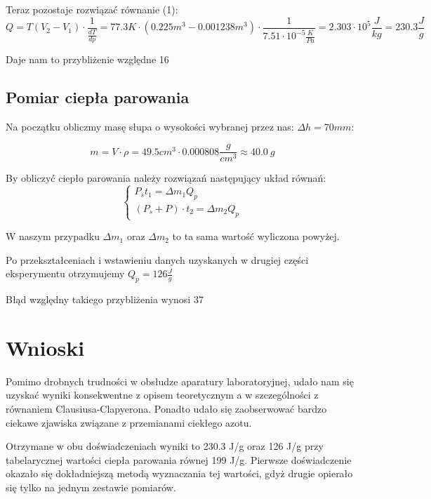 \documentclass{article}
\begin{document}
Teraz pozostaje rozwiązać równanie (1):
\begin{equation}
	Q = T(V_2-V_1) \cdot \frac{1}{\frac{dT}{dp}} = 77.3K \cdot (0.225 m^3 - 0.001238 m^3) \cdot \frac{1}{7.51 \cdot 10^{-5} \frac{K}{Pa}} = 2.303 \cdot 10^{5} \frac{J}{kg} = 230.3 \frac{J}{g}
\end{equation}

Daje nam to przybliżenie względne 16%

\subsection{Pomiar ciepła parowania}
Na początku obliczmy masę słupa o wysokości wybranej przez nas: $\Delta h = 70 mm$:

\begin{equation}
	m = V \cdot \rho = 49.5 cm^3 \cdot 0.000808 \frac{g}{cm^3} \approx 40.0 \:g
\end{equation}

By obliczyć ciepło parowania należy rozwiązań następujący układ równań:
\begin{equation}
	\begin{cases}
	P_s t_1 = \Delta m_1 Q_p \\
	(P_s + P) \cdot t_2 = \Delta m_2 Q_p
	\end{cases}
\end{equation}

W naszym przypadku $\Delta m_1$ oraz $\Delta m_2$ to ta sama wartość wyliczona powyżej.

Po przekształceniach i wstawieniu danych uzyskanych w drugiej części eksperymentu otrzymujemy $Q_p = 126 \frac{J}{g}$

Błąd względny takiego przybliżenia wynosi 37%
\section{Wnioski}

Pomimo drobnych trudności w obsłudze aparatury laboratoryjnej, udało nam się uzyskać wyniki konsekwentne z opisem teoretycznym a w szczególności z równaniem Clausiusa-Clapyerona. Ponadto udało się zaobserwować bardzo ciekawe zjawiska związane z przemianami ciekłego azotu.

Otrzymane w obu doświadczeniach wyniki to 230.3 J/g oraz 126 J/g przy tabelarycznej wartości ciepła parowania równej 199 J/g. Pierwsze doświadczenie okazało się dokładniejszą metodą wyznaczania tej wartości, gdyż drugie opierało się tylko na jednym zestawie pomiarów.
\end{document}
